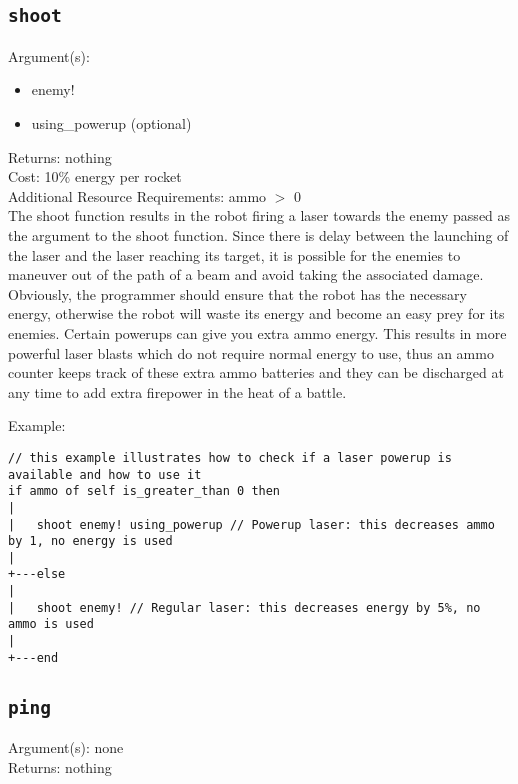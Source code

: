 \documentclass[a4paper]{article}
\begin{document}
\pagebreak

\subsection{\texttt{shoot}}

Argument(s):
\begin{itemize}
	\item enemy!
	\item using\_powerup (optional)
\end{itemize}

\noindent Returns: nothing\\

\noindent Cost: 10\% energy per rocket\\

\noindent Additional Resource Requirements: ammo $>$ 0\\

The shoot function results in the robot firing a laser towards the enemy passed as the argument to the shoot function.  Since there is delay between the launching of the laser and the laser reaching its target, it is possible for the enemies to maneuver out of the path of a beam and avoid taking the associated damage.  Obviously, the programmer should ensure that the robot has the necessary energy, otherwise the robot will waste its energy and become an easy prey for its enemies. Certain powerups can give you extra ammo energy. This results in more powerful laser blasts which do not require normal energy to use, thus an ammo counter keeps track of these extra ammo batteries and they can be discharged at any time to add extra firepower in the heat of a battle.

Example:
\begin{verbatim}
// this example illustrates how to check if a laser powerup is available and how to use it
if ammo of self is_greater_than 0 then
|
|   shoot enemy! using_powerup // Powerup laser: this decreases ammo by 1, no energy is used
|
+---else
|
|   shoot enemy! // Regular laser: this decreases energy by 5%, no ammo is used
|
+---end
\end{verbatim}

\subsection{\texttt{ping}}

Argument(s): none\\

\noindent Returns: nothing\\
\end{document}
